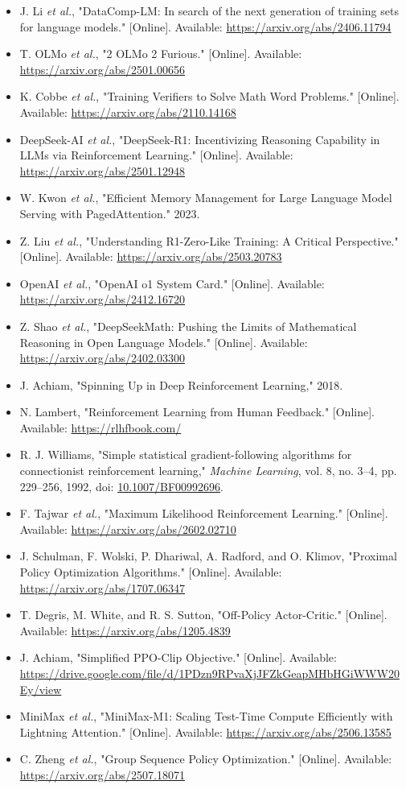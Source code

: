\begin{itemize}
  \item J. Li \textit{et al.}, "DataComp-LM: In search of the next generation of training sets for language models." [Online]. Available: \url{https://arxiv.org/abs/2406.11794}
  \item T. OLMo \textit{et al.}, "2 OLMo 2 Furious." [Online]. Available: \url{https://arxiv.org/abs/2501.00656}
  \item K. Cobbe \textit{et al.}, "Training Verifiers to Solve Math Word Problems." [Online]. Available: \url{https://arxiv.org/abs/2110.14168}
  \item DeepSeek-AI \textit{et al.}, "DeepSeek-R1: Incentivizing Reasoning Capability in LLMs via Reinforcement Learning." [Online]. Available: \url{https://arxiv.org/abs/2501.12948}
  \item W. Kwon \textit{et al.}, "Efficient Memory Management for Large Language Model Serving with PagedAttention." 2023.
  \item Z. Liu \textit{et al.}, "Understanding R1-Zero-Like Training: A Critical Perspective." [Online]. Available: \url{https://arxiv.org/abs/2503.20783}
  \item OpenAI \textit{et al.}, "OpenAI o1 System Card." [Online]. Available: \url{https://arxiv.org/abs/2412.16720}
  \item Z. Shao \textit{et al.}, "DeepSeekMath: Pushing the Limits of Mathematical Reasoning in Open Language Models." [Online]. Available: \url{https://arxiv.org/abs/2402.03300}
  \item J. Achiam, "Spinning Up in Deep Reinforcement Learning," 2018.
  \item N. Lambert, "Reinforcement Learning from Human Feedback." [Online]. Available: \url{https://rlhfbook.com/}
  \item R. J. Williams, "Simple statistical gradient-following algorithms for connectionist reinforcement learning," \textit{Machine Learning}, vol. 8, no. 3--4, pp. 229--256, 1992, doi: \url{10.1007/BF00992696}.
  \item F. Tajwar \textit{et al.}, "Maximum Likelihood Reinforcement Learning." [Online]. Available: \url{https://arxiv.org/abs/2602.02710}
  \item J. Schulman, F. Wolski, P. Dhariwal, A. Radford, and O. Klimov, "Proximal Policy Optimization Algorithms." [Online]. Available: \url{https://arxiv.org/abs/1707.06347}
  \item T. Degris, M. White, and R. S. Sutton, "Off-Policy Actor-Critic." [Online]. Available: \url{https://arxiv.org/abs/1205.4839}
  \item J. Achiam, "Simplified PPO-Clip Objective." [Online]. Available: \url{https://drive.google.com/file/d/1PDzn9RPvaXjJFZkGeapMHbHGiWWW20Ey/view}
  \item MiniMax \textit{et al.}, "MiniMax-M1: Scaling Test-Time Compute Efficiently with Lightning Attention." [Online]. Available: \url{https://arxiv.org/abs/2506.13585}
  \item C. Zheng \textit{et al.}, "Group Sequence Policy Optimization." [Online]. Available: \url{https://arxiv.org/abs/2507.18071}
\end{itemize}
